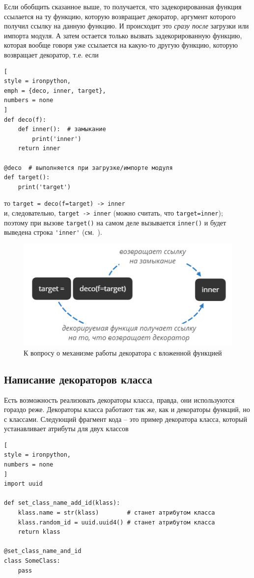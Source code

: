 \documentclass[%
	11pt,
	a4paper,
	utf8,
		]{article}
\begin{document}
Если обобщить сказанное выше, то получается, что задекорированная функция ссылается на ту функцию, которую возвращает декоратор, аргумент которого получил ссылку на данную функцию. И происходит это \emph{сразу после} загрузки или импорта модуля. А затем остается только вызвать задекорированную функцию, которая вообще говоря уже ссылается на какую-то другую функцию, которую возвращает декоратор, т.е. если
\begin{lstlisting}[
style = ironpython,
emph = {deco, inner, target},
numbers = none
]
def deco(f):
    def inner():  # замыкание
        print('inner')
    return inner
    
@deco  # выполняется при загрузке/импорте модуля
def target():
    print('target')
\end{lstlisting}
то
\lstinline[style = ironpython]{target = deco(f=target) -> inner}\\и, следовательно, \lstinline{target -> inner} (можно считать, что \lstinline{target=inner});\\поэтому при вызове \lstinline{target()} на самом деле вызывается \lstinline{inner()} и будет выведена строка \lstinline[style=ironpython]{'inner'} (см.~).

\begin{figure}[h]
	\centering
	\includegraphics[scale=0.85]{figures/target_deco_formula.png}
	\caption{ К вопросу о механизме работы декоратора с вложенной функцией }\label{fig:target_deco_formula}
\end{figure}



\subsection{Написание декораторов класса}

Есть возможность реализовать декораторы класса, правда, они используются гораздо реже. Декораторы класса работают так же, как и декораторы функций, но с классами. Следующий фрагмент кода -- это пример декоратора класса, который устанавливает атрибуты для двух классов
\begin{lstlisting}[
style = ironpython,
numbers = none	
]
import uuid

def set_class_name_add_id(klass):
    klass.name = str(klass)        # станет атрибутом класса
    klass.random_id = uuid.uuid4() # станет атрибутом класса
    return klass
    
@set_class_name_and_id
class SomeClass:
    pass
\end{lstlisting}
\end{document}
